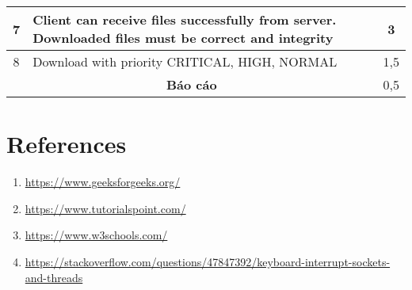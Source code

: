\documentclass[a4paper,12pt]{report}
\begin{document}
\begin{center}
\begin{tabular}{|c|p{}|c|}
    7                                      & Client can receive files successfully from server. Downloaded files must be correct and integrity     & 3              \\\hline
    8                                      & Download with priority CRITICAL, HIGH, NORMAL                                                         & 1,5            \\\hline
    \multicolumn{2}{|c|}{\textbf{Báo cáo}} & 0,5                                                                                                                    \\\hline
  \end{tabular}
\end{center}

\pagebreak
\section{References}
\begin{enumerate}
  \item \url{https://www.geeksforgeeks.org/}
  \item \url{https://www.tutorialspoint.com/}
  \item \url{https://www.w3schools.com/}
  \item \url{https://stackoverflow.com/questions/47847392/keyboard-interrupt-sockets-and-threads}
\end{enumerate}
\end{document}
